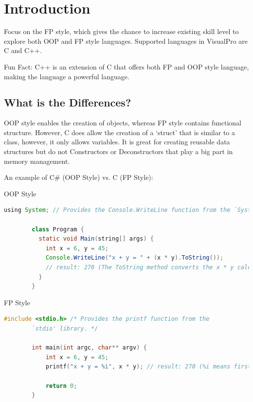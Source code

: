 \documentclass[10pt]{article}
\begin{document}
\newpage
\section{Introduction}
  Focus on the FP style, which gives the chance to increase existing skill level to explore both OOP and FP style languages. Supported languages in VisualPro are C and C++.

  \begin{tip}{Fun Fact:}
    C++ is an extension of C that offers both FP and OOP style language, making the language a powerful language.
  \end{tip}

  \subsection{What is the Differences?}
    OOP style enables the creation of objects, whereas FP style contains functional structure. However, C does allow the creation of a `struct' that is similar to a class, however, it only allows variables. It is great for creating reusable data structures but do not Constructors or Deconstructors that play a big part in memory management.
    
    An example of C\# (OOP Style) vs. C (FP Style):
    \begin{example}{OOP Style}
      \begin{lstlisting}[language=java]
        using System; // Provides the Console.WriteLine function from the `System' library.

        class Program { 
          static void Main(string[] args) {
            int x = 6, y = 45;
            Console.WriteLine("x + y = " + (x * y).ToString()); 
            // result: 270 (The ToString method converts the x * y calculation to a string and appends to the string).
          }
        }
      \end{lstlisting}
    \end{example}

    \begin{example}{FP Style}
      \begin{lstlisting}[language=c]
        #include <stdio.h> /* Provides the printf function from the 
        `stdio' library. */

        int main(int argc, char** argv) {
            int x = 6, y = 45;
            printf("x + y = %i", x * y); // result: 270 (%i means first parameter is an integer and includes it to the string).
            
            return 0;
        }
      \end{lstlisting}
    \end{example}
\end{document}
